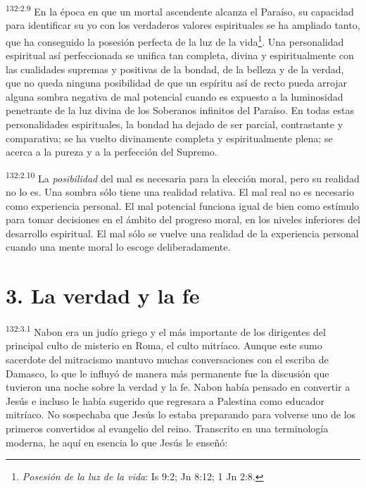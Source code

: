 \par 
\textsuperscript{132:2.9} En la época en que un mortal ascendente alcanza el Paraíso, su capacidad para identificar su yo con los verdaderos valores espirituales se ha ampliado tanto, que ha conseguido la posesión perfecta de la luz de la vida\footnote{\textit{Posesión de la luz de la vida}: Is 9:2; Jn 8:12; 1 Jn 2:8.}. Una personalidad espiritual así perfeccionada se unifica tan completa, divina y espiritualmente con las cualidades supremas y positivas de la bondad, de la belleza y de la verdad, que no queda ninguna posibilidad de que un espíritu así de recto pueda arrojar alguna sombra negativa de mal potencial cuando es expuesto a la luminosidad penetrante de la luz divina de los Soberanos infinitos del Paraíso. En todas estas personalidades espirituales, la bondad ha dejado de ser parcial, contrastante y comparativa; se ha vuelto divinamente completa y espiritualmente plena; se acerca a la pureza y a la perfección del Supremo.

\par 
\textsuperscript{132:2.10} La \textit{posibilidad} del mal es necesaria para la elección moral, pero su realidad no lo es. Una sombra sólo tiene una realidad relativa. El mal real no es necesario como experiencia personal. El mal potencial funciona igual de bien como estímulo para tomar decisiones en el ámbito del progreso moral, en los niveles inferiores del desarrollo espiritual. El mal sólo se vuelve una realidad de la experiencia personal cuando una mente moral lo escoge deliberadamente.

\section*{3. La verdad y la fe}
\par 
\textsuperscript{132:3.1} Nabon era un judío griego y el más importante de los dirigentes del principal culto de misterio en Roma, el culto mitríaco. Aunque este sumo sacerdote del mitracismo mantuvo muchas conversaciones con el escriba de Damasco, lo que le influyó de manera más permanente fue la discusión que tuvieron una noche sobre la verdad y la fe. Nabon había pensado en convertir a Jesús e incluso le había sugerido que regresara a Palestina como educador mitríaco. No sospechaba que Jesús lo estaba preparando para volverse uno de los primeros convertidos al evangelio del reino. Transcrito en una terminología moderna, he aquí en esencia lo que Jesús le enseñó:


